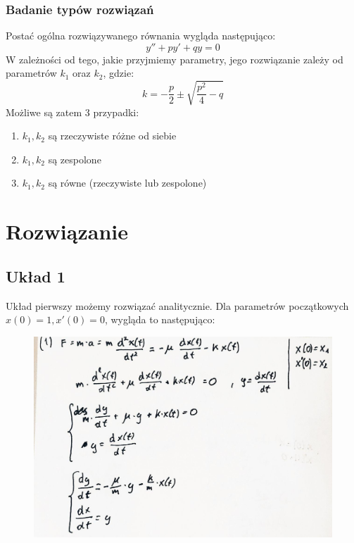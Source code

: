 \documentclass[12pt]{article}
\begin{document}
\subsubsection{Badanie typów rozwiązań}
Postać ogólna rozwiązywanego równania wygląda następująco:
$$ y'' + py' + qy = 0 $$
W zależności od tego, jakie przyjmiemy parametry, jego rozwiązanie zależy
od parametrów $k_1$ oraz $k_2$, gdzie:
$$k = -\frac{p}{2} \pm \sqrt{\frac{p^2}{4}-q}$$
Możliwe są zatem 3 przypadki:
\begin{enumerate}
    \item $k_1, k_2$ są rzeczywiste różne od siebie
    \item $k_1, k_2$ są zespolone
    \item $k_1, k_2$ są równe (rzeczywiste lub zespolone)
\end{enumerate}

\section{Rozwiązanie}

\subsection{Układ 1}

Układ pierwszy możemy rozwiązać analitycznie. Dla parametrów początkowych \\
$x(0) = 1, x'(0) = 0$, wygląda to następująco:

\begin{figure}[H]
\centering
    \includegraphics[scale=0.28]{./img/rozw-1.jpg}
\end{figure}
\end{document}
